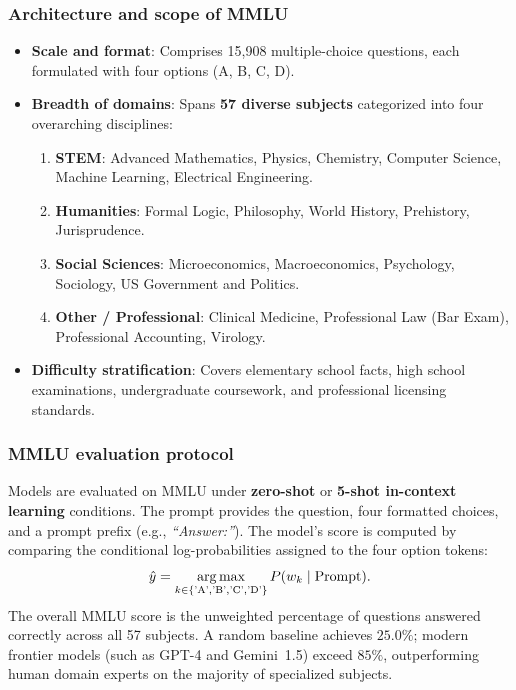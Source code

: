 \documentclass[../../main.tex]{subfiles}
\begin{document}
\subsubsection{Architecture and scope of MMLU}
\begin{itemize}
    \item \textbf{Scale and format}: Comprises 15,908 multiple-choice questions, each formulated with four options (A, B, C, D).
    \item \textbf{Breadth of domains}: Spans \textbf{57 diverse subjects} categorized into four overarching disciplines:
    \begin{enumerate}
        \item \textbf{STEM}: Advanced Mathematics, Physics, Chemistry, Computer Science, Machine Learning, Electrical Engineering.
        \item \textbf{Humanities}: Formal Logic, Philosophy, World History, Prehistory, Jurisprudence.
        \item \textbf{Social Sciences}: Microeconomics, Macroeconomics, Psychology, Sociology, US Government and Politics.
        \item \textbf{Other / Professional}: Clinical Medicine, Professional Law (Bar Exam), Professional Accounting, Virology.
    \end{enumerate}
    \item \textbf{Difficulty stratification}: Covers elementary school facts, high school examinations, undergraduate coursework, and professional licensing standards.
\end{itemize}

\subsubsection{MMLU evaluation protocol}
Models are evaluated on MMLU under \textbf{zero-shot} or \textbf{5-shot in-context learning} conditions. The prompt provides the question, four formatted choices, and a prompt prefix (e.g., \textit{``Answer:''}). The model's score is computed by comparing the conditional log-probabilities assigned to the four option tokens:
\begin{equation}
\label{eq:mmlu_scoring}
\hat{y} = \operatorname*{\mathrm{arg\,max}}_{k \in \{\text{'A'}, \text{'B'}, \text{'C'}, \text{'D'}\}} P(w_k \mid \text{Prompt}).
\end{equation}
The overall MMLU score is the unweighted percentage of questions answered correctly across all 57 subjects. A random baseline achieves $25.0\%$; modern frontier models (such as GPT-4 and Gemini~1.5) exceed $85\%$, outperforming human domain experts on the majority of specialized subjects.
\end{document}
